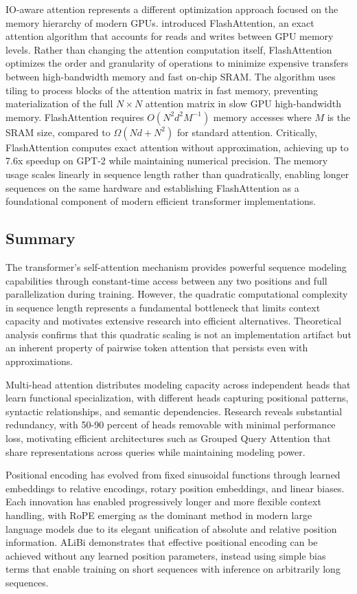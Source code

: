 \documentclass[11pt,letterpaper]{article}
\begin{document}
IO-aware attention represents a different optimization approach focused on the memory hierarchy of modern GPUs. \cite{dao2022flashattention} introduced FlashAttention, an exact attention algorithm that accounts for reads and writes between GPU memory levels. Rather than changing the attention computation itself, FlashAttention optimizes the order and granularity of operations to minimize expensive transfers between high-bandwidth memory and fast on-chip SRAM. The algorithm uses tiling to process blocks of the attention matrix in fast memory, preventing materialization of the full $N \times N$ attention matrix in slow GPU high-bandwidth memory. FlashAttention requires $O(N^2 d^2 M^{-1})$ memory accesses where $M$ is the SRAM size, compared to $\Omega(Nd + N^2)$ for standard attention. Critically, FlashAttention computes exact attention without approximation, achieving up to 7.6x speedup on GPT-2 while maintaining numerical precision. The memory usage scales linearly in sequence length rather than quadratically, enabling longer sequences on the same hardware and establishing FlashAttention as a foundational component of modern efficient transformer implementations.

\subsection{Summary}

The transformer's self-attention mechanism provides powerful sequence modeling capabilities through constant-time access between any two positions and full parallelization during training. However, the quadratic computational complexity in sequence length represents a fundamental bottleneck that limits context capacity and motivates extensive research into efficient alternatives. Theoretical analysis confirms that this quadratic scaling is not an implementation artifact but an inherent property of pairwise token attention that persists even with approximations.

Multi-head attention distributes modeling capacity across independent heads that learn functional specialization, with different heads capturing positional patterns, syntactic relationships, and semantic dependencies. Research reveals substantial redundancy, with 50-90 percent of heads removable with minimal performance loss, motivating efficient architectures such as Grouped Query Attention that share representations across queries while maintaining modeling power.

Positional encoding has evolved from fixed sinusoidal functions through learned embeddings to relative encodings, rotary position embeddings, and linear biases. Each innovation has enabled progressively longer and more flexible context handling, with RoPE emerging as the dominant method in modern large language models due to its elegant unification of absolute and relative position information. ALiBi demonstrates that effective positional encoding can be achieved without any learned position parameters, instead using simple bias terms that enable training on short sequences with inference on arbitrarily long sequences.
\end{document}
